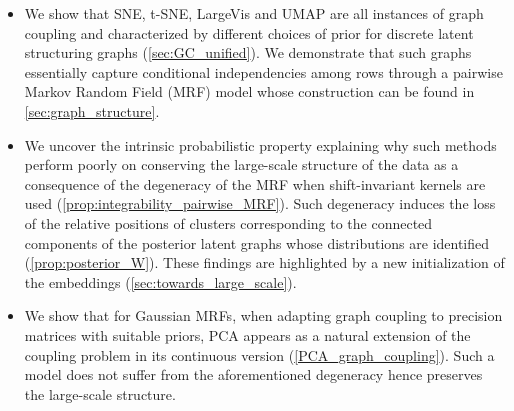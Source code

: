 \begin{itemize}
    \item We show that SNE, t-SNE, LargeVis and UMAP are all instances of graph coupling and characterized by different choices of prior for discrete latent structuring graphs (\cref{sec:GC_unified}). We demonstrate that such graphs essentially capture conditional independencies among rows through a pairwise Markov Random Field (MRF) model whose construction can be found in \cref{sec:graph_structure}.
    \item We uncover the intrinsic probabilistic property explaining why such methods perform poorly on conserving the large-scale structure of the data as a consequence of the degeneracy of the MRF when shift-invariant kernels are used (\cref{prop:integrability_pairwise_MRF}). Such degeneracy induces the loss of the relative positions of clusters corresponding to the connected components of the posterior latent graphs whose distributions are identified (\cref{prop:posterior_W}). These findings are highlighted by a new initialization of the embeddings (\cref{sec:towards_large_scale}).
    \item We show that for Gaussian MRFs, when adapting graph coupling to precision matrices with suitable priors, PCA appears as a natural extension of the coupling problem in its continuous version (\cref{PCA_graph_coupling}). Such a model does not suffer from the aforementioned degeneracy hence preserves the large-scale structure.
\end{itemize}